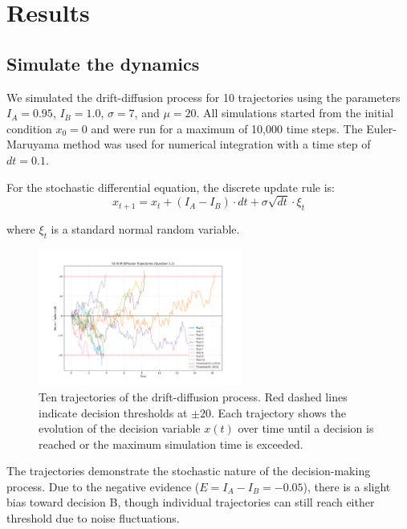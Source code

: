\documentclass[11pt,a4paper]{article}
\begin{document}
\section{Results}

\subsection{Simulate the dynamics}

We simulated the drift-diffusion process for 10 trajectories using the parameters $I_A = 0.95$, $I_B = 1.0$, $\sigma = 7$, and $\mu = 20$. All simulations started from the initial condition $x_0 = 0$ and were run for a maximum of 10,000 time steps.
The Euler-Maruyama method was used for numerical integration with a time step of $dt = 0.1$.

For the stochastic differential equation, the discrete update rule is:
\begin{equation}
x_{t+1} = x_t + (I_A - I_B) \cdot dt + \sigma \sqrt{dt} \cdot \xi_t
\end{equation}

where $\xi_t$ is a standard normal random variable.


\begin{figure}[H]
    \centering
    \includegraphics[width=0.6\textwidth]{ddm_trajectories_10.png}
    \caption{Ten trajectories of the drift-diffusion process. Red dashed lines indicate decision thresholds at $\pm 20$. Each trajectory shows the evolution of the decision variable $x(t)$ over time until a decision is reached or the maximum simulation time is exceeded.}
    \label{fig:trajectories}
\end{figure}

The trajectories demonstrate the stochastic nature of the decision-making process. Due to the negative evidence ($E = I_A - I_B = -0.05$), there is a slight bias toward decision B, though individual trajectories can still reach either threshold due to noise fluctuations.
\end{document}

